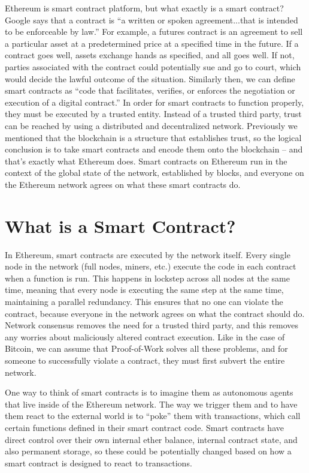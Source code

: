 \documentclass[full.tex]{subfiles}
\begin{document}
    Ethereum is smart contract platform, but what exactly is a smart contract? Google says that a contract is ``a written or spoken agreement...that is intended to be enforceable by law.'' For example, a futures contract is an agreement to sell a particular asset at a predetermined price at a specified time in the future. If a contract goes well, assets exchange hands as specified, and all goes well. If not, parties associated with the contract could potentially sue and go to court, which would decide the lawful outcome of the situation. Similarly then, we can define smart contracts as ``code that facilitates, verifies, or enforces the negotiation or execution of a digital contract.'' In order for smart contracts to function properly, they must be executed by a trusted entity. Instead of a trusted third party, trust can be reached by using a distributed and decentralized network. Previously we mentioned that the blockchain is a structure that establishes trust, so the logical conclusion is to take smart contracts and encode them onto the blockchain -- and that's exactly what Ethereum does. Smart contracts on Ethereum run in the context of the global state of the network, established by blocks, and everyone on the Ethereum network agrees on what these smart contracts do.
    
    \section*{What is a Smart Contract?}
    
    In Ethereum, smart contracts are executed by the network itself. Every single node in the network (full nodes, miners, etc.) execute the code in each contract when a function is run. This happens in lockstep across all nodes at the same time, meaning that every node is executing the same step at the same time, maintaining a parallel redundancy. This ensures that no one can violate the contract, because everyone in the network agrees on what the contract should do. Network consensus removes the need for a trusted third party, and this removes any worries about maliciously altered contract execution. Like in the case of Bitcoin, we can assume that Proof-of-Work solves all these problems, and for someone to successfully violate a contract, they must first subvert the entire network.
    
    One way to think of smart contracts is to imagine them as autonomous agents that live inside of the Ethereum network. The way we trigger them and to have them react to the external world is to ``poke'' them with transactions, which call certain functions defined in their smart contract code. Smart contracts have direct control over their own internal ether balance, internal contract state, and also permanent storage, so these could be potentially changed based on how a smart contract is designed to react to transactions.
    
\end{document}
